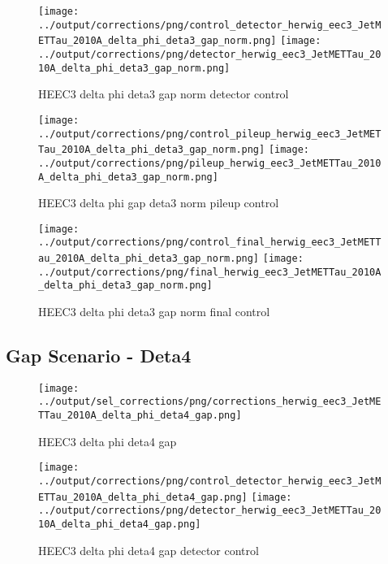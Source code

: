 \documentclass[11pt]{book}
\begin{document}
\begin{figure}[ht]
\centering
\texttt{[image: ../output/corrections/png/control\_detector\_herwig\_eec3\_JetMETTau\_2010A\_delta\_phi\_deta3\_gap\_norm.png]}
\texttt{[image: ../output/corrections/png/detector\_herwig\_eec3\_JetMETTau\_2010A\_delta\_phi\_deta3\_gap\_norm.png]}
\caption{HEEC3 delta phi deta3 gap norm detector control}
\label{fig:HEEC3_JetMETTau_2010A_delta_phi_deta3_gap_norm_detector_control}
\end{figure}

\begin{figure}[ht]
\centering
\texttt{[image: ../output/corrections/png/control\_pileup\_herwig\_eec3\_JetMETTau\_2010A\_delta\_phi\_deta3\_gap\_norm.png]}
\texttt{[image: ../output/corrections/png/pileup\_herwig\_eec3\_JetMETTau\_2010A\_delta\_phi\_deta3\_gap\_norm.png]}
\caption{HEEC3 delta phi gap deta3 norm pileup control}
\label{fig:HEEC3_JetMETTau_2010A_delta_phi_deta3_gap_norm_pileup_control}
\end{figure}


\begin{figure}[ht]
\centering
\texttt{[image: ../output/corrections/png/control\_final\_herwig\_eec3\_JetMETTau\_2010A\_delta\_phi\_deta3\_gap\_norm.png]}
\texttt{[image: ../output/corrections/png/final\_herwig\_eec3\_JetMETTau\_2010A\_delta\_phi\_deta3\_gap\_norm.png]}
\caption{HEEC3 delta phi deta3 gap norm final control}
\label{fig:HEEC3_JetMETTau_2010A_delta_phi_deta3_gap_norm_final_control}
\end{figure}


\clearpage
\subsection{Gap Scenario - Deta4}
\begin{figure}[ht]
\centering
\texttt{[image: ../output/sel\_corrections/png/corrections\_herwig\_eec3\_JetMETTau\_2010A\_delta\_phi\_deta4\_gap.png]}
\caption{HEEC3 delta phi deta4 gap}
\label{fig:HEEC3_JetMETTau_2010A_delta_phi_deta4_gap}
\end{figure}

\begin{figure}[ht]
\centering
\texttt{[image: ../output/corrections/png/control\_detector\_herwig\_eec3\_JetMETTau\_2010A\_delta\_phi\_deta4\_gap.png]}
\texttt{[image: ../output/corrections/png/detector\_herwig\_eec3\_JetMETTau\_2010A\_delta\_phi\_deta4\_gap.png]}
\caption{HEEC3 delta phi deta4 gap detector control}
\label{fig:HEEC3_JetMETTau_2010A_delta_phi_deta4_gap_detector_control}
\end{figure}
\end{document}
